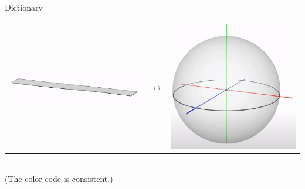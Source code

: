 \documentclass[10pt]{beamer}
\begin{document}
\begin{frame}{Dictionary}
\begin{center}
\begin{tabular}{m{3cm} m{2cm} m{3cm}}
        \includegraphics[scale=0.15]{Pictures/flatbelt.png} & $\longleftrightarrow$ & \includegraphics[scale=0.1]{Pictures/4pisphere4.png}
    \end{tabular}\\
    (The color code is consistent.)
    \end{center}
\end{frame}
\end{document}
